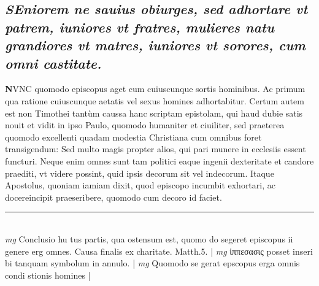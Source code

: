 \documentclass{article}
\begin{document}
\begin{pages}
\subsection*{\textit{\huge\textbf{S}\normalsize Eniorem ne sauius obiurges, sed adhortare vt patrem, iuniores vt fratres, mulieres natu grandiores vt matres, iuniores vt sorores, cum omni castitate. }}\pstart \huge\textbf{N}\normalsize VNC quomodo episcopus aget cum cuiuscunque sortis hominibus. Ac primum qua ratione cuiuscunque aetatis vel sexus homines adhortabitur. Certum autem est non Timothei tantùm caussa hanc scriptam epistolam, qui haud dubie satis nouit et vidit in ipso Paulo, quomodo humaniter et ciuiliter, sed praeterea quomodo excellenti quadam modestia Christiana cum omnibus foret transigendum: Sed multo magis propter alios, qui pari munere in ecclesiis essent functuri. Neque enim omnes sunt tam politici eaque ingenii dexteritate et candore praediti, vt videre possint, quid ipsis decorum sit vel indecorum. Itaque Apostolus, quoniam iamiam dixit, quod episcopo incumbit exhortari, ac docereincipit praeseribere, quomodo cum decoro id faciet.  \pend
\vspace{0.5cm}\noindent
\vspace{0.2cm}\rule{1cm}{0.2pt}\\ 
\hspace{0.2cm}\textit{mg}
\footnotesize Conclusio hu tus partis, qua ostensum est, quomo do segeret episcopus ii genere erg omnes. Causa finalis ex charitate. Matth.5. 
\normalsize| 
\hspace{0.2cm}\textit{mg}
\footnotesize ἱππεσασις posset inseri bi tanquam symbolum in annulo. 
\normalsize| 
\hspace{0.2cm}\textit{mg}
\footnotesize Quomodo se gerat epscopus erga omnis condi stionis homines 
\normalsize| 

\end{pages}
\end{document}
